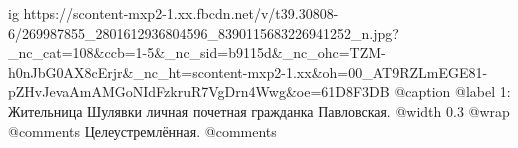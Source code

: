  
 
 
 
 

\ifcmt
  ig https://scontent-mxp2-1.xx.fbcdn.net/v/t39.30808-6/269987855_2801612936804596_8390115683226941252_n.jpg?_nc_cat=108&ccb=1-5&_nc_sid=b9115d&_nc_ohc=TZM-h0nJbG0AX8cErjr&_nc_ht=scontent-mxp2-1.xx&oh=00_AT9RZLmEGE81-pZHvJevaAmAMGoNIdFzkruR7VgDrn4Wwg&oe=61D8F3DB
  @caption @label 1: Жительница Шулявки личная почетная гражданка Павловская.
  @width 0.3
  @wrap \parpic[r]
  @comments%
    Целеустремлённая.
  @comments%
\fi
